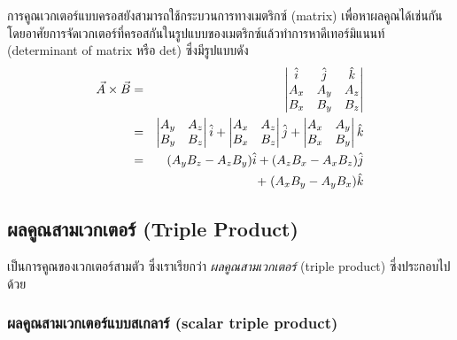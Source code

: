 การคูณเวกเตอร์แบบครอสยังสามารถใช้กระบวนการทางเมตริกซ์ (matrix) เพื่อหาผลคูณได้เช่นกัน โดยอาศัยการจัดเวกเตอร์ที่ครอสกันในรูปแบบของเมตริกซ์แล้วทำการหาดีเทอร์มิแนนท์ (determinant of matrix หรือ det) ซึ่งมีรูปแบบดัง
\begin{eqnarray}\label{AcrossBMatrix}
\vec{A}\times\vec{B} &=& \begin{vmatrix} \hat{i} & \hat{j} & \hat{k} \\ A_x & A_y & A_z \\ B_x & B_y & B_z \end{vmatrix} \nonumber \\
        &=& \begin{vmatrix}A_y & A_z \\ B_y & B_z \end{vmatrix}\hat{i} + \begin{vmatrix}A_x & A_z \\ B_x & B_z \end{vmatrix}\hat{j} + \begin{vmatrix}A_x & A_y \\ B_x & B_y \end{vmatrix}\hat{k} \nonumber \\
        &=& (A_yB_z - A_zB_y)\hat{i} + (A_zB_x - A_xB_z)\hat{j} \nonumber \\
        & & +\;(A_xB_y - A_yB_x)\hat{k}
\end{eqnarray}

\subsection{ผลคูณสามเวกเตอร์ (Triple Product)}

เป็นการคูณของเวกเตอร์สามตัว ซึ่งเราเรียกว่า \textit{ผลคูณสามเวกเตอร์} (triple product) ซี่งประกอบไปด้วย \\
\subsubsection{ผลคูณสามเวกเตอร์แบบสเกลาร์ (scalar triple product)}

